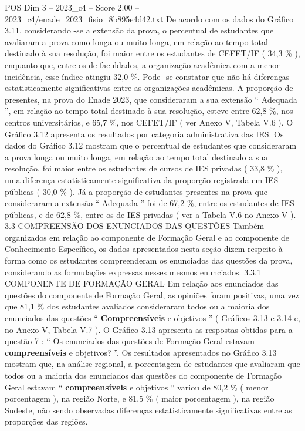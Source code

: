 \begin{textsample}{POS Dim 3 – 2023\_c4 – Score 2.00 – 2023\_c4/enade\_2023\_fisio\_8b895e4d42.txt}
De acordo com os dados do Gráfico 3.11, considerando -se a extensão da prova, o percentual de estudantes que avaliaram a prova como longa ou muito longa, em relação ao tempo total destinado à sua resolução, foi maior entre os estudantes de CEFET/IF ( 34,3 \% ), enquanto que, entre os de faculdades, a organização acadêmica com a menor incidência, esse índice atingiu 32,0 \%.
Pode -se constatar que não há diferenças estatisticamente significativas entre as organizações acadêmicas.
A proporção de presentes, na prova do Enade 2023, que consideraram a sua extensão “ Adequada ”, em relação ao tempo total destinado à sua resolução, esteve entre 62,8 \%, nos centros universitários, e 65,7 \%, nos CEFET/IF ( ver Anexo V, Tabela V.6 ).
O Gráfico 3.12 apresenta os resultados por categoria administrativa das IES.
Os dados do Gráfico 3.12 mostram que o percentual de estudantes que consideraram a prova longa ou muito longa, em relação ao tempo total destinado a sua resolução, foi maior entre os estudantes de cursos de IES privadas ( 33,8 \% ), uma diferença estatisticamente significativa da proporção registrada em IES públicas ( 30,0 \% ).
Já a proporção de estudantes presentes na prova que consideraram a extensão “ Adequada ” foi de 67,2 \%, entre os estudantes de IES públicas, e de 62,8 \%, entre os de IES privadas ( ver a Tabela V.6 no Anexo V ). 3.3 COMPREENSÃO DOS ENUNCIADOS DAS QUESTÕES Também organizados em relação ao componente de Formação Geral e ao componente de Conhecimento Específico, os dados apresentados nesta seção dizem respeito à forma como os estudantes compreenderam os enunciados das questões da prova, considerando as formulações expressas nesses mesmos enunciados. 3.3.1 COMPONENTE DE FORMAÇÃO GERAL Em relação aos enunciados das questões do componente de Formação Geral, as opiniões foram positivas, uma vez que 81,1 \% dos estudantes avaliados consideraram todos ou a maioria dos enunciados das questões “ \textbf{Compreensíveis} e objetivos ” ( Gráficos 3.13 e 3.14 e, no Anexo V, Tabela V.7 ).
O Gráfico 3.13 apresenta as respostas obtidas para a questão 7 : “ Os enunciados das questões de Formação Geral estavam \textbf{compreensíveis} e objetivos? ”.
Os resultados apresentados no Gráfico 3.13 mostram que, na análise regional, a porcentagem de estudantes que avaliaram que todos ou a maioria dos enunciados das questões do componente de Formação Geral estavam “ \textbf{compreensíveis} e objetivos ” variou de 80,2 \% ( menor porcentagem ), na região Norte, e 81,5 \% ( maior porcentagem ), na região Sudeste, não sendo observadas diferenças estatisticamente significativas entre as proporções das regiões.

\end{textsample}
